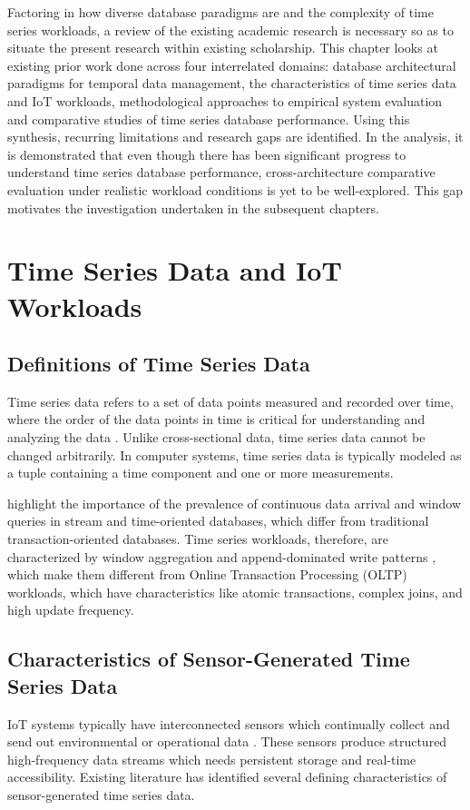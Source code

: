 Factoring in how diverse database paradigms are and the complexity of time series workloads, a review of the existing academic research is necessary so as to situate the present research within existing scholarship. This chapter looks at existing prior work done across four interrelated domains: database architectural paradigms for temporal data management, the characteristics of time series data and IoT workloads, methodological approaches to empirical system evaluation and comparative studies of time series database performance. Using this synthesis, recurring limitations and research gaps are identified. In the analysis, it is demonstrated that even though there has been significant progress to understand time series database performance, cross-architecture comparative evaluation under realistic workload conditions is yet to be well-explored. This gap motivates the investigation undertaken in the subsequent chapters. 


\section{Time Series Data and IoT Workloads}
\subsection{Definitions of Time Series Data}
Time series data refers to a set of data points measured and recorded over time, where the order of the data points in time is critical for understanding and analyzing the data \cite{Grzesik2020}. Unlike cross-sectional data, time series data cannot be changed arbitrarily. In computer systems, time series data is typically modeled as a tuple containing a time component and one or more measurements.

\citet*{Stonebraker_2005} highlight the importance of the prevalence of continuous data arrival and window queries in stream and time-oriented databases, which differ from traditional transaction-oriented databases. Time series workloads, therefore, are characterized by window aggregation and append-dominated write patterns \citep{Grzesik2020}, which make them different from Online Transaction Processing (OLTP) workloads, which have characteristics like atomic transactions, complex joins, and high update frequency.


\subsection{Characteristics of Sensor-Generated Time Series Data}
IoT systems typically have interconnected sensors which continually collect and send out environmental or operational data \cite{GUBBI20131645}. These sensors produce structured high-frequency data streams which needs persistent storage and real-time accessibility. Existing literature has identified several defining characteristics of sensor-generated time series data. 


